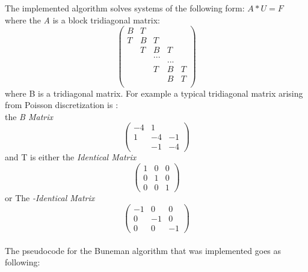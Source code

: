 The implemented algorithm solves systems of the following form:
 $A*U = F$\\  
where the \emph{A} is a block tridiagonal matrix: 
\[ \left( \begin{array}{ccccc}
B  & T &     &   &\\
T  & B &  T  &    &\\
   & T &  B  & T  &\\
   &   & ...    &    &  \\     
   &   &     & ...  &  \\
   &   &  T  & B & T \\    
   &   &     & B & T\\	
    \end{array} \right)\] 
where B is a tridiagonal matrix. For example a typical tridiagonal matrix arising from 
Poisson discretization is : \\
the \emph{B Matrix}
\[ \left( \begin{array}{ccc}
-4 & 1 &  \\
1  & -4 & -1 \\
   & -1 & -4 \end{array} \right)\] 
and T is either the \emph{Identical Matrix}
\[ \left( \begin{array}{ccc}
1 & 0 & 0 \\
0 & 1 & 0 \\
0 & 0 & 1 \end{array} \right)\] or The \emph{-Identical Matrix}
\[ \left( \begin{array}{ccc}
-1 & 0 & 0 \\
0 & -1 & 0 \\
0 & 0 & -1 \end{array} \right)\] 
\\
The pseudocode for the Buneman algorithm that was implemented goes as following: 
